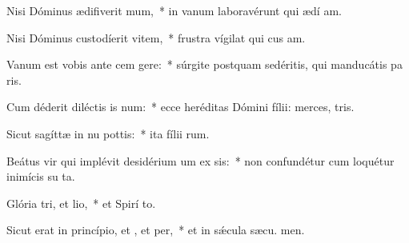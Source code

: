 \item Nisi Dóminus ædifiverit mum,~* in vanum laboravérunt qui ædí am.
\item Nisi Dóminus custodíerit vitem,~* frustra vígilat qui cus am.
\item Vanum est vobis ante cem gere:~* súrgite postquam sedéritis, qui manducátis pa ris.
\item Cum déderit diléctis is num:~* ecce heréditas Dómini fílii: merces,  tris.
\item Sicut sagíttæ in nu pottis:~* ita fílii rum.
\item Beátus vir qui implévit desidérium um ex sis:~* non confundétur cum loquétur inimícis su  ta.
\item Glória tri, et lio,~* et Spirí to.
\item Sicut erat in princípio, et , et per,~* et in sǽcula sæcu. men.
